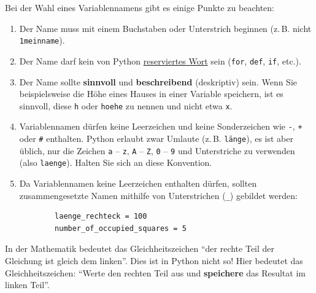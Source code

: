 \begin{myoverview}
	Bei der Wahl eines Variablennamens gibt es einige Punkte zu beachten:
	\begin{enumerate}
		\item Der Name muss mit einem Buchstaben oder Unterstrich beginnen (z.\,B. nicht \verb|1meinname|).
		\item Der Name darf kein von Python \href{https://www.programiz.com/python-programming/keyword-list}{reserviertes Wort} sein (\lstinline|for|, \lstinline|def|, \lstinline|if|, etc.).
		\item Der Name sollte \textbf{sinnvoll} und \textbf{beschreibend} (deskriptiv) sein. Wenn Sie beispielsweise die Höhe eines Hauses in einer Variable speichern, ist es sinnvoll, diese \lstinline|h| oder \lstinline|hoehe| zu nennen und nicht etwa \lstinline|x|.
		\item Variablennamen dürfen keine Leerzeichen und keine Sonderzeichen wie \texttt{-}, \texttt{+} oder \texttt{\#} enthalten. Python erlaubt zwar Umlaute (z.\,B. \lstinline|länge|), es ist aber üblich, nur die Zeichen \texttt{a} -- \texttt{z}, \texttt{A} -- \texttt{Z}, \texttt{0} -- \texttt{9} und Unterstriche zu verwenden (also \lstinline|laenge|). Halten Sie sich an diese Konvention.
		\item Da Variablennamen keine Leerzeichen enthalten dürfen, sollten zusammengesetzte Namen mithilfe von Unterstrichen (\lstinline{_}) gebildet werden:
		      \begin{lstlisting}
		laenge_rechteck = 100
		number_of_occupied_squares = 5
		\end{lstlisting}
	\end{enumerate}
\end{myoverview}

\begin{myattention}
	In der Mathematik bedeutet das Gleichheitszeichen \enquote{der rechte Teil der Gleichung ist gleich dem linken}. Dies ist in Python nicht so! Hier bedeutet das Gleichheitszeichen: \enquote{Werte den rechten Teil aus und \textbf{speichere} das Resultat im linken Teil}.
\end{myattention}

